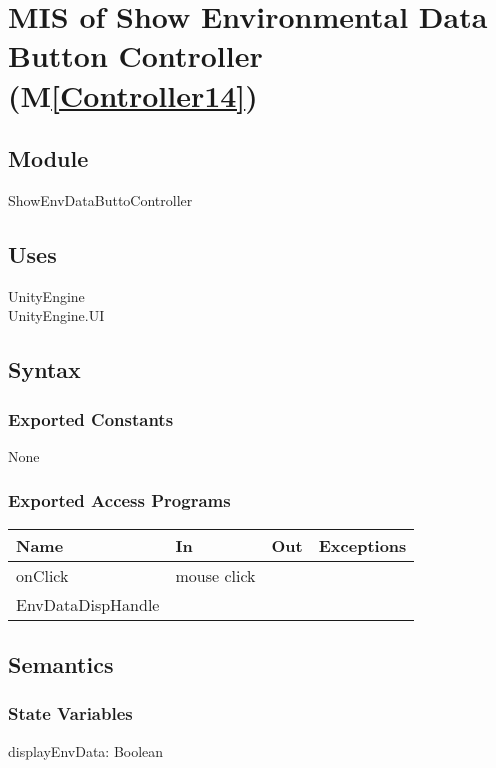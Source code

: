 \documentclass[12pt, titlepage]{article}
\newcommand{\mref}[1]{M\ref{#1}}
\begin{document}

\newpage

\section{MIS of Show Environmental Data Button Controller (\mref{Controller14})} 

\subsection{Module}

ShowEnvDataButtoController

\subsection{Uses}
UnityEngine\\
UnityEngine.UI\\

\subsection{Syntax}

\subsubsection{Exported Constants}
None
\subsubsection{Exported Access Programs}

\begin{center}
\begin{tabular}{| l | l | l | p{5cm}|}
\hline
\textbf{Name} & \textbf{In} & \textbf{Out} & \textbf{Exceptions} \\
\hline
onClick & mouse click &  &  \\
\hline
EnvDataDispHandle &&&\\
\hline
\end{tabular}
\end{center}

\subsection{Semantics}

\subsubsection{State Variables}
displayEnvData: Boolean
\end{document}
